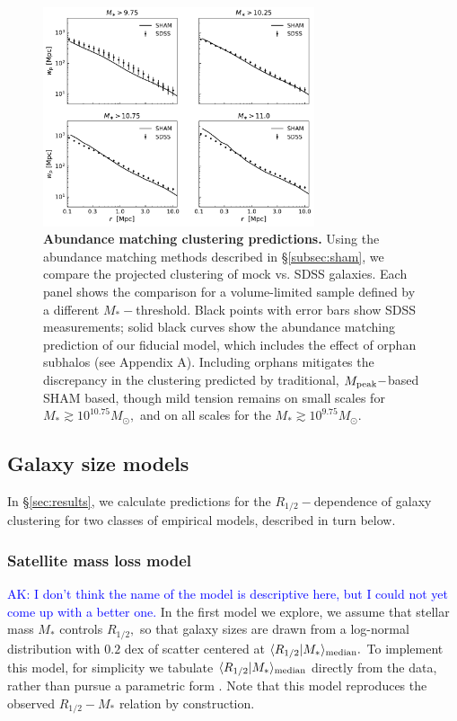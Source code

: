 \documentclass[usenatbib,usegraphicx,letterpaper]{mn2e}
\newcommand{\rhalf}{R_{1/2}}
\newcommand{\mstar}{M_{\ast}}
\newcommand{\mpeak}{M_{\rm peak}}
\newcommand{\median}[2]{\langle{#1}\vert{#2}\rangle_{\rm median}}
\newcommand{\msun}{M_\odot}
\begin{document}
\begin{figure}
\centering
\includegraphics[width=8cm]{FIGS/baseline_sham.pdf}
\caption{
{\bf Abundance matching clustering predictions.}
Using the abundance matching methods described in \S\ref{subsec:sham}, we compare the projected clustering of mock vs. SDSS galaxies. Each panel shows the comparison for a volume-limited sample defined by a different $\mstar-$threshold. Black points with error bars show SDSS measurements; solid black curves show the abundance matching prediction of our fiducial model, which includes the effect of orphan subhalos (see Appendix A). Including orphans mitigates the discrepancy in the clustering predicted by traditional, $\mpeak-$based SHAM based, though mild tension remains on small scales for $\mstar\gtrsim10^{10.75}\msun,$ and on all scales for the $\mstar\gtrsim10^{9.75}\msun.$
}
\label{fig:baseline_sham_clustering}
\end{figure}

\subsection{Galaxy size models}
\label{subsec:model}

In \S\ref{sec:results}, we calculate predictions for the $\rhalf-$dependence of galaxy clustering for two classes of empirical models, described in turn below.

\subsubsection{Satellite mass loss model}
\label{subsubsec:strippingmodel}

\textcolor{blue}{AK: I don't think the name of the model is descriptive here, but I could not yet come up with a better one.}
In the first model we explore, we assume that stellar mass $\mstar$ controls $\rhalf,$ so that galaxy sizes are drawn from a log-normal distribution with $0.2$ dex of scatter centered at $\median{\rhalf}{\mstar}.$ To implement this model, for simplicity we tabulate $\median{\rhalf}{\mstar}$ directly from the data, rather than pursue a parametric form \citep[see, e.g.,][]{zhang_yang17}. Note that this model reproduces the observed $\rhalf-\mstar$ relation by construction.
\end{document}
